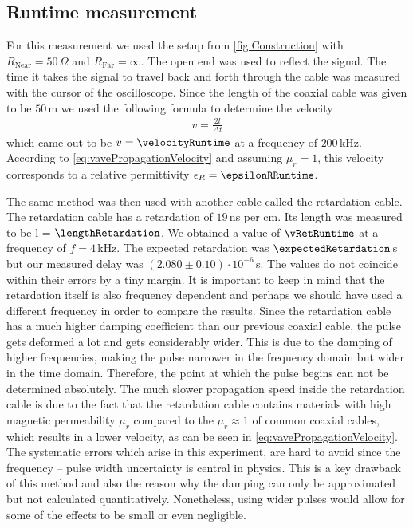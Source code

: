 \documentclass[a4paper,10pt,twocolumn]{article}
\begin{document}
    \subsection{Runtime measurement}
    \label{subsec:runtimeMeasurement}
    For this measurement we used the setup from \autoref{fig:Construction} with $R_{\text{Near}}=50\,\Omega$ and $R_{\text{Far}}=\infty$.
    The open end was used to reflect the signal.
    The time it takes the signal to travel back and forth through the cable was measured with the cursor of the oscilloscope.
    Since the length of the coaxial cable was given to be $50\,$m we used the following formula to determine the velocity
    \begin{align}
        \label{eq:runtimeVelocity}
        v=\frac{2l}{\Delta t}
    \end{align}
    which came out to be $v = \velocityRuntime$ at a frequency of $200\,$kHz.
    According to \autoref{eq:vavePropagationVelocity} and assuming $\mu_r = 1$, this velocity corresponds to a relative permittivity $\epsilon_R = \epsilonRRuntime$.
    
    The same method was then used with another cable called the retardation cable.
    The retardation cable has a retardation of $19\,$ns per cm.
    Its length was measured to be l = $\lengthRetardation$.
    We obtained a value of $\vRetRuntime$ at a frequency of $f = 4\,$kHz.
    The expected retardation was $\expectedRetardation\,$s but our measured delay was $(2.080\pm 0.10)\cdot10^{-6}\,$s.
    The values do not coincide within their errors by a tiny margin.
    It is important to keep in mind that the retardation itself is also frequency dependent and perhaps we should have used a different frequency in order to compare the results.
    Since the retardation cable has a much higher damping coefficient than our previous coaxial cable,
    the pulse gets deformed a lot and gets considerably wider.
    This is due to the damping of higher frequencies, making the pulse narrower in the frequency domain but wider in the time domain.
    Therefore, the point at which the pulse begins can not be determined absolutely.
    The much slower propagation speed inside the retardation cable is due to the fact that the retardation cable contains materials with high magnetic permeability $\mu_r$ compared to the $\mu_r \approx 1 $ of
    common coaxial cables, which results in a lower velocity, as can be seen in \autoref{eq:vavePropagationVelocity}.
    The systematic errors which arise in this experiment, are hard to avoid since the frequency -- pulse width uncertainty is central in physics.
    This is a key drawback of this method and also the reason why the damping can only be approximated but not calculated quantitatively.
    Nonetheless, using wider pulses would allow for some of the effects to be small or even negligible.
\end{document}

